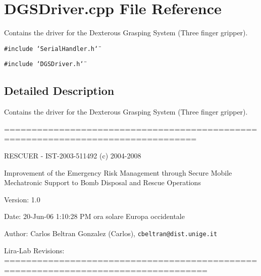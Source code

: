 \section{DGSDriver.cpp File Reference}
\label{DGSDriver_8cpp}
Contains the driver for the Dexterous Grasping System (Three finger gripper).  


{\tt \#include \char`\"{}Serial\-Handler.h\char`\"{}}\par
{\tt \#include \char`\"{}DGSDriver.h\char`\"{}}\par


\subsection{Detailed Description}
Contains the driver for the Dexterous Grasping System (Three finger gripper). 

=================================================================================

RESCUER - IST-2003-511492 (c) 2004-2008

Improvement of the Emergency Risk Management through Secure Mobile Mechatronic Support to Bomb Disposal and Rescue Operations

\begin{Desc}
\item[Version:]1.0 \end{Desc}
\begin{Desc}
\item[Date:]20-Jun-06 1:10:28 PM ora solare Europa occidentale \end{Desc}
\begin{Desc}
\item[Author:]Carlos Beltran Gonzalez (Carlos), {\tt cbeltran@dist.unige.it} 

Lira-Lab Revisions: ===================================================================================\end{Desc}
